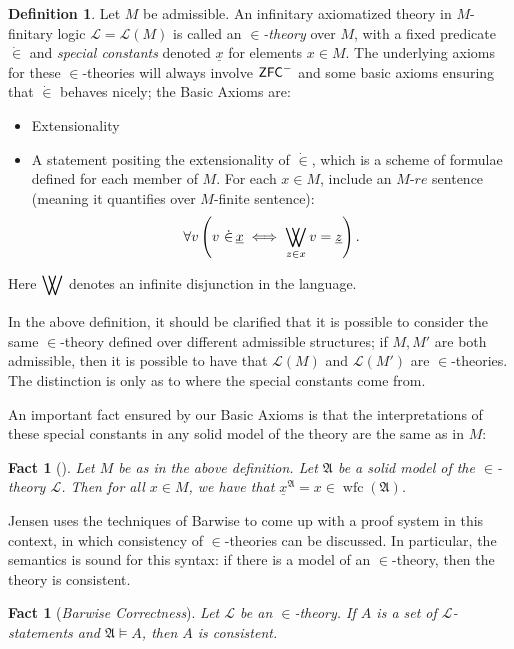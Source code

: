 \documentclass{amsart}
\newtheorem{fact}[theorem]{Fact}
\theoremstyle{definition}
\newtheorem{definition}[theorem]{Definition}
\theoremstyle{remark}
\newcommand{\ZFC}{\textup{\ensuremath{\textsf{ZFC}}}}
\DeclareMathOperator{\wfc}{wfc}
\DeclareMathOperator*{\bigdoublevee}{\bigvee\mkern-15mu\bigvee}
\begin{document}
\begin{definition} \label{def:InTheoriesAndBasicAxioms} Let $M$ be admissible. An infinitary axiomatized theory in $M$-finitary logic $\mathcal L=\mathcal L(M)$ is called an \textit{$\in$-theory} over $M$, with a fixed predicate $\dot \in$ and \emph{special constants} denoted $\underline x$ for elements $x \in M$. The underlying axioms for these $\in$-theories will always involve $\ZFC^-$ and some basic axioms ensuring that $\dot \in$ behaves nicely; 
the \textsf{Basic Axioms} are: \begin{itemize}
	\item \textsf{Extensionality}
	\item A statement positing the extensionality of $\dot \in$, which is a scheme of formulae defined for each member of $M$. For each $x \in M$, include an $M$-$re$ sentence (meaning it quantifies over $M$-finite sentence): 
	$$\forall v \left( v \ \dot \in\, \underline x \iff \bigdoublevee_{z \in x} v= \underline z \right).$$
\end{itemize} Here $\displaystyle\bigdoublevee$ denotes an infinite disjunction in the language.\end{definition}

In the above definition, it should be clarified that it is possible to consider the same $\in$-theory defined over different admissible structures; if $M, M'$ are both admissible, then it is possible to have that $\mathcal L(M)$ and $\mathcal L(M')$ are $\in$-theories. The distinction is only as to where the special constants come from. 

An important fact ensured by our \textsf{Basic Axioms} is that the interpretations of these special constants in any solid model of the theory are the same as in $M$:

\begin{fact}[{\cite[Ch. 2, Lemma 9]{Jensen:2014}}] \label{fact:PointofBasicAxioms} Let $M$ be as in the above definition. Let $\mathfrak A$ be a solid model of the $\in$-theory $\mathcal L$. Then for all $x \in M$, we have that $\underline{x}^{\mathfrak A} = x \in \wfc(\mathfrak A)$. \end{fact}

Jensen uses the techniques of Barwise to come up with a proof system in this context, in which consistency of $\in$-theories can be discussed. In particular, the semantics is sound for this syntax: if there is a model of an \(\in\)-theory, then the theory is consistent. 
\begin{fact}[\emph{Barwise Correctness}] \label{fact:correctness} 
Let $\mathcal L$ be an $\in$-theory. If $A$ is a set of $\mathcal L$-statements and $\mathfrak A \models A$, then $A$ is consistent. \end{fact}
\end{document}
